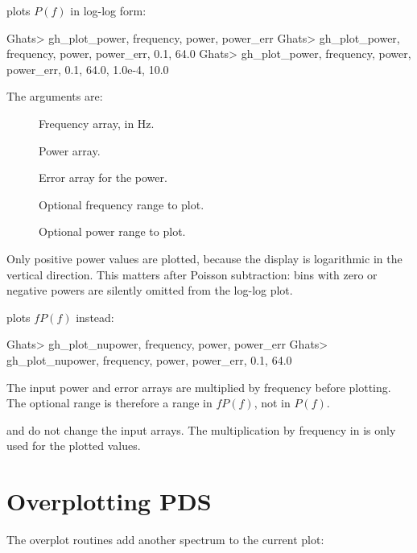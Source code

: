  plots \(P(f)\) in log-log form:

\begin{ghatsconsole}
Ghats> gh_plot_power, frequency, power, power_err
Ghats> gh_plot_power, frequency, power, power_err, 0.1, 64.0
Ghats> gh_plot_power, frequency, power, power_err, 0.1, 64.0, 1.0e-4, 10.0
\end{ghatsconsole}

The arguments are:

\begin{description}
\item[] Frequency array, in Hz.
\item[] Power array.
\item[] Error array for the power.
\item[] Optional frequency range to plot.
\item[] Optional power range to plot.
\end{description}

Only positive power values are plotted, because the display is logarithmic in
the vertical direction.  This matters after Poisson subtraction: bins with
zero or negative powers are silently omitted from the log-log plot.

 plots \(fP(f)\) instead:

\begin{ghatsconsole}
Ghats> gh_plot_nupower, frequency, power, power_err
Ghats> gh_plot_nupower, frequency, power, power_err, 0.1, 64.0
\end{ghatsconsole}

The input power and error arrays are multiplied by frequency before plotting.
The optional  range is therefore a range in \(fP(f)\), not in
\(P(f)\).

\begin{ghatsnote}
 and  do not change the
input arrays.  The multiplication by frequency in 
is only used for the plotted values.
\end{ghatsnote}

\section{Overplotting PDS}

The overplot routines add another spectrum to the current plot:

